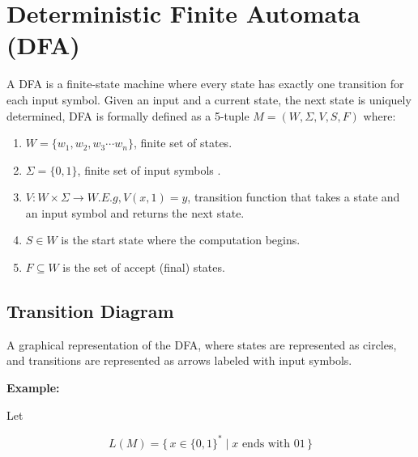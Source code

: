 \documentclass[12pt,a4paper,openany]{article}
\begin{document}
\section{Deterministic Finite Automata (DFA)}

A DFA is a finite-state machine where every state has exactly one transition for each input symbol.
Given an input and a current state, the next state is uniquely determined, DFA is formally defined as a 5-tuple $M = (W, \Sigma, V, S, F)$ where:

\begin{enumerate}
    \item $W = \{w_1, w_2,w_3 \cdots w_n\}$, finite set of states.
    \item $\Sigma = \{0,1\}$, finite set of input symbols .
    \item $V: W \times \Sigma \to W. E.g, V(x, 1) = y$, transition function that takes a state and an input symbol and returns the next state.
    \item $S \in W$ is the start state where the computation begins.
    \item $F \subseteq W$ is the set of accept (final) states.
\end{enumerate}

\subsection{Transition Diagram}
    
A graphical representation of the DFA, where states are represented as circles, and transitions are represented as arrows labeled with input symbols.
    
\textbf{Example:}

Let 

\[L(M) = \{\, x \in \{0,1\}^* \mid x \text{ ends with } 01 \,\}\]

\begin{center}
\end{center}
\end{document}
